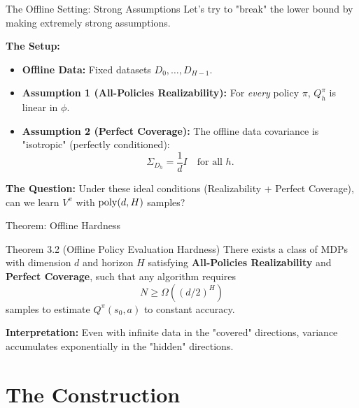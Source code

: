 \documentclass[aspectratio=169]{beamer}
\begin{document}
\begin{frame}{The Offline Setting: Strong Assumptions}
    Let's try to "break" the lower bound by making extremely strong assumptions.
    
    \textbf{The Setup:}
    \begin{itemize}
        \item \textbf{Offline Data:} Fixed datasets $D_0, \dots, D_{H-1}$.
\pause        \item \textbf{Assumption 1 (All-Policies Realizability):} 
        For \emph{every} policy $\pi$, $Q^\pi_h$ is linear in $\phi$.
\pause        \item \textbf{Assumption 2 (Perfect Coverage):} 
        The offline data covariance is "isotropic" (perfectly conditioned):
        \[
        \Sigma_{D_h} = \frac{1}{d} I \quad \text{for all } h.
        \]
    \end{itemize}

    \vspace{0.3cm}
\pause    \textbf{The Question:} Under these ideal conditions (Realizability + Perfect Coverage), can we learn $V^\pi$ with $\mathrm{poly}(d, H)$ samples?
\end{frame}

\begin{frame}{Theorem: Offline Hardness}
  \begin{block}{Theorem 3.2 (Offline Policy Evaluation Hardness)}
    There exists a class of MDPs with dimension $d$ and horizon $H$ satisfying \textbf{All-Policies Realizability} and \textbf{Perfect Coverage}, such that any algorithm requires
    \[
    N \ge \Omega\left( (d/2)^H \right)
    \]
    samples to estimate $Q^\pi(s_0,a)$ to constant accuracy.
    \end{block}

    \vspace{0.3cm}
    \textbf{Interpretation:}
    Even with infinite data in the "covered" directions, variance accumulates exponentially in the "hidden" directions.
\end{frame}





\section{The Construction}
\end{document}
